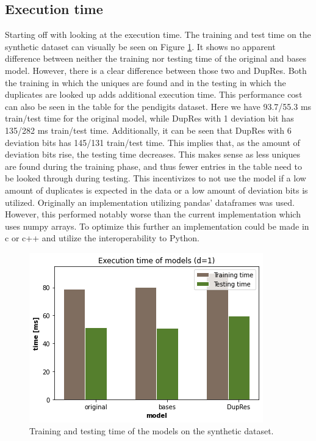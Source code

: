 \subsection{Execution time}
Starting off with looking at the execution time. The training and test time on the synthetic dataset can visually be seen on Figure \ref{fig:performance_time}. It shows no apparent difference between neither the training nor testing time of the original and bases model. However, there is a clear difference between those two and DupRes. Both the training in which the uniques are found and in the testing in which the duplicates are looked up adds additional execution time. This performance cost can also be seen in the table for the pendigits dataset. Here we have 93.7/55.3 ms train/test time for the original model, while DupRes with 1 deviation bit has 135/282 ms train/test time. Additionally, it can be seen that DupRes with 6 deviation bits has 145/131 train/test time. This implies that, as the amount of deviation bits rise, the testing time decreases. This makes sense as less uniques are found during the training phase, and thus fewer entries in the table need to be looked through during testing. This incentivizes to not use the model if a low amount of duplicates is expected in the data or a low amount of deviation bits is utilized. Originally an implementation utilizing pandas'\cite{pandas} dataframes was used. However, this performed notably worse than the current implementation which uses numpy\cite{numpy} arrays. To optimize this further an implementation could be made in c or c++ and utilize the interoperability to Python.

\begin{figure}
  \centering
  \includegraphics[width=0.8\linewidth]{images/performance_time.png}
  \caption{Training and testing time of the models on the synthetic dataset.}
  \label{fig:performance_time}
\end{figure}

